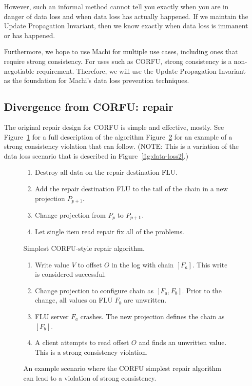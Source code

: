 \documentclass[preprint,10pt]{sigplanconf}
\begin{document}
However, such an informal method
cannot tell you exactly when you are in danger of data loss and when
data loss has actually happened.  If we maintain the Update
Propagation Invariant, then we know exactly when data loss is immanent
or has happened.

Furthermore, we hope to use Machi for multiple use cases, including
ones that require strong consistency.
For uses such as CORFU, strong consistency is a non-negotiable
requirement.  Therefore, we will use the Update Propagation Invariant
as the foundation for Machi's data loss prevention techniques.

\subsection{Divergence from CORFU: repair}
\label{sub:repair-divergence}

The original repair design for CORFU is simple and effective,
mostly.  See Figure~\ref{fig:corfu-style-repair} for a full
description of the algorithm
Figure~\ref{fig:corfu-repair-sc-violation} for an example of a strong
consistency violation that can follow.  (NOTE: This is a variation of
the data loss scenario that is described in
Figure~\ref{fig:data-loss2}.)

\begin{figure}
\begin{enumerate}
\item Destroy all data on the repair destination FLU.
\item Add the repair destination FLU to the tail of the chain in a new
  projection $P_{p+1}$.
\item Change projection from $P_p$ to $P_{p+1}$.
\item Let single item read repair fix all of the problems.
\end{enumerate}
\caption{Simplest CORFU-style repair algorithm.}
\label{fig:corfu-style-repair}
\end{figure}

\begin{figure}
\begin{enumerate}
\item Write value $V$ to offset $O$ in the log with chain $[F_a]$.
  This write is considered successful.
\item Change projection to configure chain as $[F_a,F_b]$.  Prior to
  the change, all values on FLU $F_b$ are unwritten.
\item FLU server $F_a$ crashes.  The new projection defines the chain
  as $[F_b]$.
\item A client attempts to read offset $O$ and finds an unwritten
  value.  This is a strong consistency violation.
\end{enumerate}
\caption{An example scenario where the CORFU simplest repair algorithm
  can lead to a violation of strong consistency.}
\label{fig:corfu-repair-sc-violation}
\end{figure}
\end{document}
